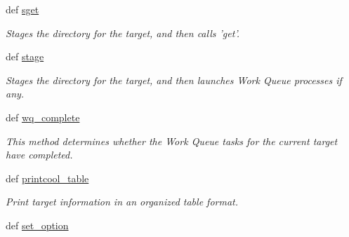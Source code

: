 \begin{DoxyCompactItemize}
def \hyperlink{classforcebalance_1_1target_1_1Target_a51d58b55242bf4d4909c1837174f5f3c}{sget}
\begin{DoxyCompactList}\small\item\em Stages the directory for the target, and then calls 'get'. \end{DoxyCompactList}\item 
def \hyperlink{classforcebalance_1_1target_1_1Target_af8d2a4658c87841e40296795aec478bb}{stage}
\begin{DoxyCompactList}\small\item\em Stages the directory for the target, and then launches Work Queue processes if any. \end{DoxyCompactList}\item 
def \hyperlink{classforcebalance_1_1target_1_1Target_af6099ec09486213869dba2491bd8ea04}{wq\-\_\-complete}
\begin{DoxyCompactList}\small\item\em This method determines whether the Work Queue tasks for the current target have completed. \end{DoxyCompactList}\item 
def \hyperlink{classforcebalance_1_1target_1_1Target_ac30a4e9d7d9fe06f7caefa5f7cfab09b}{printcool\-\_\-table}
\begin{DoxyCompactList}\small\item\em Print target information in an organized table format. \end{DoxyCompactList}\item 
def \hyperlink{classforcebalance_1_1BaseClass_a73e9a37a7632e79eb99f49bd15aced45}{set\-\_\-option}
\end{DoxyCompactItemize}
